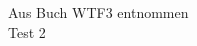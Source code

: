 \documentclass[12pt,a4paper]{article}
\begin{document}


\newpage
\tableofcontents
\newpage



Aus Buch WTF3 entnommen \cite{test} \\
Test 2 \cite{the_id}

%
%
%
%




\end{document}
